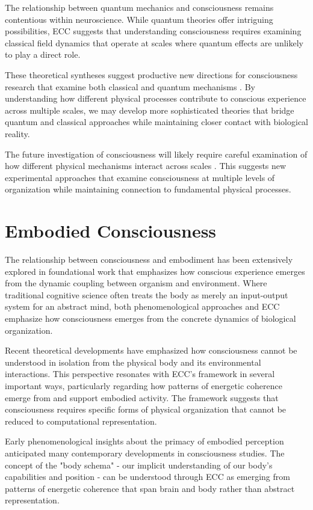 \begin{refsection}
The relationship between quantum mechanics and consciousness \cite{Stapp2009} remains contentious within neuroscience. While quantum theories offer intriguing possibilities, ECC suggests that understanding consciousness requires examining classical field dynamics that operate at scales where quantum effects are unlikely to play a direct role.

These theoretical syntheses suggest productive new directions for consciousness research that examine both classical and quantum mechanisms \cite{Hagan2002}. By understanding how different physical processes contribute to conscious experience across multiple scales, we may develop more sophisticated theories that bridge quantum and classical approaches while maintaining closer contact with biological reality.

The future investigation of consciousness will likely require careful examination of how different physical mechanisms interact across scales \cite{Beck1992}. This suggests new experimental approaches that examine consciousness at multiple levels of organization while maintaining connection to fundamental physical processes.

\section{Embodied Consciousness}

The relationship between consciousness and embodiment has been extensively explored in foundational work \cite{Varela1991, MerleauPonty1962} that emphasizes how conscious experience emerges from the dynamic coupling between organism and environment. Where traditional cognitive science often treats the body as merely an input-output system for an abstract mind, both phenomenological approaches and ECC emphasize how consciousness emerges from the concrete dynamics of biological organization.

Recent theoretical developments \cite{Thompson2007} have emphasized how consciousness cannot be understood in isolation from the physical body and its environmental interactions. This perspective resonates with ECC's framework in several important ways, particularly regarding how patterns of energetic coherence emerge from and support embodied activity. The framework suggests that consciousness requires specific forms of physical organization that cannot be reduced to computational representation.

Early phenomenological insights \cite{MerleauPonty1962} about the primacy of embodied perception anticipated many contemporary developments in consciousness studies. The concept of the "body schema" - our implicit understanding of our body's capabilities and position - can be understood through ECC as emerging from patterns of energetic coherence that span brain and body rather than abstract representation.


\end{refsection}
